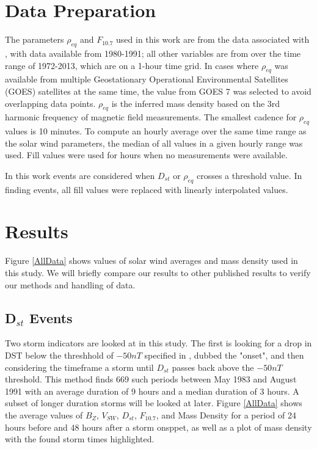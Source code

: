\documentclass[10pt,twocolumn]{article}
\begin{document}
\section{Data Preparation}

The parameters $\rho_{eq}$ and $F_{10.7}$ used in this work are from the data associated with \cite{Denton}, with data available from 1980-1991; all other variables are from \cite{Reconstruction} over the time range of 1972-2013, which are on a 1-hour time grid.  In cases where $\rho_{eq}$ was available from multiple Geostationary Operational Environmental Satellites (GOES) satellites at the same time, the value from GOES 7 was selected to avoid overlapping data points.  $\rho_{eq}$ is the inferred mass density based on the 3rd harmonic frequency of magnetic field measurements.  The smallest cadence for $\rho_{eq}$ values is 10 minutes.  To compute an hourly average over the same time range as the solar wind parameters, the median of all values in a given hourly range was used.  Fill values were used for hours when no measurements were available.

In this work events are considered when $D_{st}$ or $\rho_{eq}$ crosses a threshold value.  In finding events, all fill values were replaced with linearly interpolated values.  



\section{Results}

Figure \ref{AllData} shows values of solar wind averages and mass density used in this study. We will briefly compare our results to other published results to verify our methods and handling of data. 

\subsection{D$_{st}$ Events}
Two storm indicators are looked at in this study. The first is looking for a drop in DST below the threshhold of $-50nT$ specified in \cite{Takahashi2010}, dubbed the "onset", and then considering the timeframe a storm until $D_{st}$ passes back above the $-50nT$ threshold. This method finds 669 such periods between May 1983 and August 1991 with an average duration of 9 hours and a median duration of 3 hours. A subset of longer duration storms will be looked at later. Figure \ref{AllData} shows the average values of $B_Z$, $V_{SW}$, $D_{st}$, $F_{10.7}$, and Mass Density for a period of 24 hours before and 48 hours after a storm onsppet, as well as a plot of mass density with the found storm times highlighted.
\end{document}

